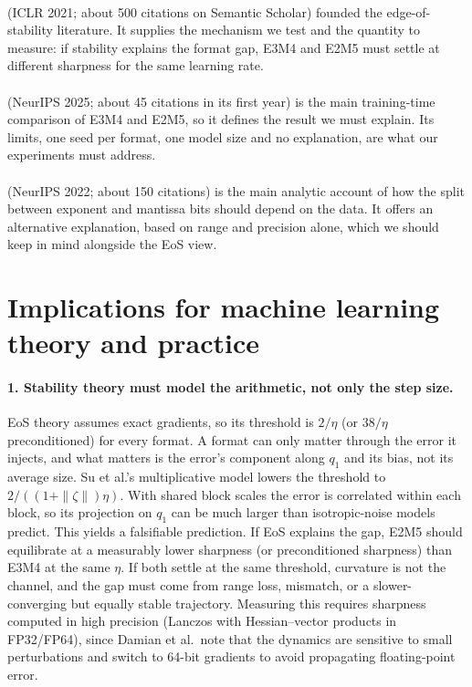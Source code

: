 \documentclass[11pt,letterpaper]{article}
\begin{document}
\paragraph{\citet{Cohen2021}} (ICLR 2021; about 500 citations on Semantic Scholar) founded the edge-of-stability literature. It supplies the mechanism we test and the quantity to measure: if stability explains the format gap, E3M4 and E2M5 must settle at different sharpness for the same learning rate.

\paragraph{\citet{Chmiel2025}} (NeurIPS 2025; about 45 citations in its first year) is the main training-time comparison of E3M4 and E2M5, so it defines the result we must explain. Its limits, one seed per format, one model size and no explanation, are what our experiments must address.

\paragraph{\citet{Kuzmin2022}} (NeurIPS 2022; about 150 citations) is the main analytic account of how the split between exponent and mantissa bits should depend on the data. It offers an alternative explanation, based on range and precision alone, which we should keep in mind alongside the EoS view.

\newpage
\section{Implications for machine learning theory and practice}

\paragraph{1. Stability theory must model the arithmetic, not only the step size.}
EoS theory \citep{Cohen2021,Damian2023,Cohen2022} assumes exact gradients, so its threshold is $2/\eta$ (or $38/\eta$ preconditioned) for every format. A format can only matter through the error it injects, and what matters is the error's component along $q_1$ and its bias, not its average size. Su et al.'s multiplicative model lowers the threshold to $2/((1+\|\zeta\|)\eta)$. With shared block scales the error is correlated within each block, so its projection on $q_1$ can be much larger than isotropic-noise models predict. This yields a falsifiable prediction. If EoS explains the gap, E2M5 should equilibrate at a measurably lower sharpness (or preconditioned sharpness) than E3M4 at the same $\eta$. If both settle at the same threshold, curvature is not the channel, and the gap must come from range loss, mismatch, or a slower-converging but equally stable trajectory. Measuring this requires sharpness computed in high precision (Lanczos with Hessian--vector products in FP32/FP64), since Damian et al.\ note that the dynamics are sensitive to small perturbations and switch to 64-bit gradients to avoid propagating floating-point error.
\end{document}
